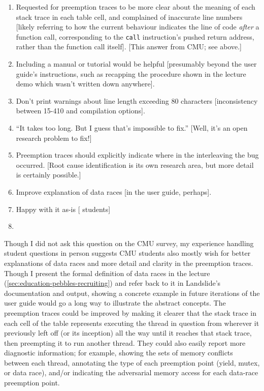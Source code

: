 \begin{enumerate}
	\item Requested for preemption traces to be more clear about the meaning of each stack trace in each table cell,
		and complained of inaccurate line numbers
		[likely referring to how the current behaviour indicates the line of code {\em after} a function call,
		corresponding to the {\tt call} instruction's pushed return address,
		rather than the function call itself]. [This answer from CMU; see above.]
	\item Including a manual or tutorial would be helpful [presumably beyond the user guide's instructions, such as recapping the procedure shown in the lecture demo which wasn't written down anywhere].
	\item Don't print warnings about line length exceeding 80 characters [inconsistency between 15-410 and \psuos compilation options].
	\item ``It takes too long. But I guess that's impossible to fix.'' [Well, it's an open research problem to fix!]
	\item Preemption traces should explicitly indicate where in the interleaving the bug occurred.
		[Root cause identification is its own research area, but more detail is certainly possible.]
	\item Improve explanation of data races [in the user guide, perhaps].
	\item Happy with it as-is [ students]
	\item {}
\end{enumerate}

Though I did not ask this question on the CMU survey,
my experience handling student questions in person
suggests CMU students
also mostly wish for
better explanations of data races and
more detail and clarity in the preemption traces.
Though I present the formal definition of data races in the lecture
(\cref{sec:education-pebbles-recruiting})
and refer back to it in Landslide's documentation and output,
showing a concrete example
in future iterations of the user guide
would go a long way to illustrate the abstract concepts.
The preemption traces could be improved by making it clearer that the stack trace in each cell of the table
represents executing the thread in question from wherever it previously left off (or its inception)
all the way until it reaches that stack trace, then preempting it to run another thread.
They could also easily report more diagnostic information;
for example, showing the sets of memory conflicts between each thread,
annotating the type of each preemption point (yield, mutex, or data race),
and/or indicating the adversarial memory access for each data-race preemption point.

